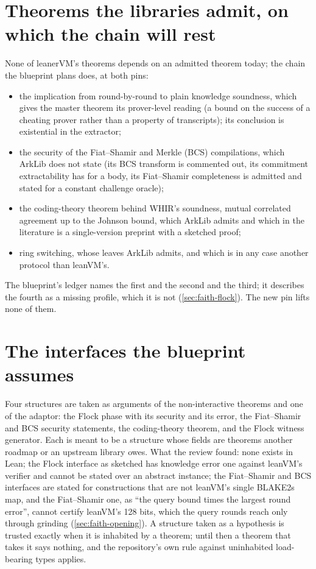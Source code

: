 \section{Theorems the libraries admit, on which the chain will rest}

None of leanerVM's theorems depends on an admitted theorem today; the chain the blueprint
plans does, at both pins:
\begin{itemize}
\item the implication from round-by-round to plain knowledge soundness, which gives the master
  theorem its prover-level reading (a bound on the success of a cheating prover rather than a
  property of transcripts); its conclusion is existential in the extractor;
\item the security of the Fiat--Shamir and Merkle (BCS) compilations, which ArkLib does not
  state (its BCS transform is commented out, its commitment extractability has  for
  a body, its Fiat--Shamir completeness is admitted and stated for a constant challenge
  oracle);
\item the coding-theory theorem behind WHIR's soundness, mutual correlated agreement up to the
  Johnson bound, which ArkLib admits and which in the literature is a single-version preprint
  with a sketched proof;
\item ring switching, whose leaves ArkLib admits, and which is in any case another protocol
  than leanVM's.
\end{itemize}
The blueprint's ledger names the first and the second and the third; it describes the fourth
as a missing profile, which it is not (\cref{sec:faith-flock}). The new pin lifts none of
them.

\section{The interfaces the blueprint assumes}

Four structures are taken as arguments of the non-interactive theorems and one of the
adaptor: the Flock phase with its security and its error, the Fiat--Shamir and BCS security
statements, the coding-theory theorem, and the Flock witness generator. Each is meant to be a
structure whose fields are theorems another roadmap or an upstream library owes. What the
review found: none exists in Lean; the Flock interface as sketched has knowledge error one
against leanVM's verifier and cannot be stated over an abstract instance; the Fiat--Shamir and
BCS interfaces are stated for constructions that are not leanVM's single BLAKE2s map, and the
Fiat--Shamir one, as \enquote{the query bound times the largest round error}, cannot certify
leanVM's 128 bits, which the query rounds reach only through grinding
(\cref{sec:faith-opening}). A structure taken as a hypothesis is trusted exactly when it is
inhabited by a theorem; until then a theorem that takes it says nothing, and the repository's
own rule against uninhabited load-bearing types applies.

